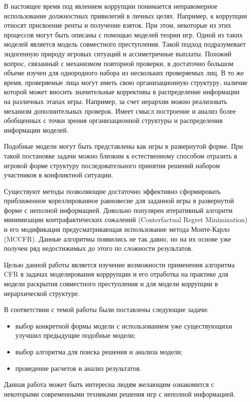 \Introduction

\par
В настоящее время под явлением коррупции понимается неправомерное использование должностных привилегий в личных целях. Например, к коррупции относят присвоение ренты и получение взяток. При этом, некоторые из этих процессов могут быть описаны с помощью моделей теории игр. Одной из таких моделей является модель совместного преступления\cite{Spengler}. Такой подход подразумевает эндогенную природу игровых ситуаций и ассиметричные выплаты. Похожий вопрос, связанный с механизмом повторной проверки, в достаточно большом объеме изучен для однородного набора из нескольких проверяемых лиц\cite{Kumacheva}. В то же время, проверяемые лица могут иметь свою организационную структуру, наличие которой может вносить значительные коррективы в распределение информации на различных этапах игры. Например, за счет иерархии можно реализовать механизм дополнительных проверок\cite{Orlov}. Имеет смысл построение и анализ более обобщенных с точки зрения организационной структуры и распределения информации моделей.
\par
Подобные модели могут быть представлены как игры в развернутой форме. При такой постановке задачи можно близким к естественному способом отразить в игровой форме структуру последовательного принятия решений набором участников в конфликтной ситуации.
\par
Существуют методы позволяющие достаточно эффективно сформировать приближенное кореллированное равновесие для заданной игры в развернутой форме с неполной информацией. Довольно популярен итеративный алгоритм минимизации контрафактических сожалений (Conterfactual Regret Minimization)\cite{NIPS07cfr} и его модификация предусматривающая использование метода Монте-Карло (MCCFR)\cite{MCCFR}.  Данные алгоритмы появились не так давно, но на их основе уже получен ряд недостижимых до этого по сложности результатов.
\par
Целью данной работы является изучение возможности применения алгоритма CFR в задачах моделирования корррупции и его отработка на практике для модели раскрытия совместного преступления и для модели коррупции в иерархической структуре.
\par
В соответствии с темой работы были поставлены следующие задачи:
\begin{itemize}
	\item выбор конкретной формы модели с использованием уже существующихи улучшил предыдущие подобные модели;
	\item выбор алгоритма для поиска решения и анализа модели;
	\item проведение расчетов и анализ результатов.
\end{itemize}
\par
Данная работа может быть интересна людям желающим ознакомится с некоторыми современными техниками решения игр с неполной информацией.
